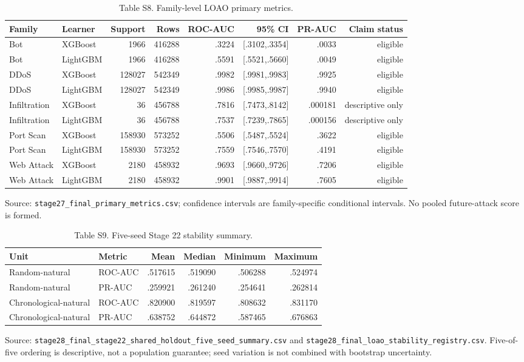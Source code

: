 \documentclass[preprint,12pt]{elsarticle}
\begin{document}
\begin{table}[htbp]
\centering\tiny
\caption{Table S8. Family-level LOAO primary metrics.}
\begin{tabular}{@{}llrrrrrr@{}}
\toprule
Family & Learner & Support & Rows & ROC-AUC & 95\% CI & PR-AUC & Claim status\\
\midrule
Bot & XGBoost & 1966 & 416288 & .3224 & [.3102,.3354] & .0033 & eligible\\
Bot & LightGBM & 1966 & 416288 & .5591 & [.5521,.5660] & .0049 & eligible\\
DDoS & XGBoost & 128027 & 542349 & .9982 & [.9981,.9983] & .9925 & eligible\\
DDoS & LightGBM & 128027 & 542349 & .9986 & [.9985,.9987] & .9940 & eligible\\
Infiltration & XGBoost & 36 & 456788 & .7816 & [.7473,.8142] & .000181 & descriptive only\\
Infiltration & LightGBM & 36 & 456788 & .7537 & [.7239,.7865] & .000156 & descriptive only\\
Port Scan & XGBoost & 158930 & 573252 & .5506 & [.5487,.5524] & .3622 & eligible\\
Port Scan & LightGBM & 158930 & 573252 & .7559 & [.7546,.7570] & .4191 & eligible\\
Web Attack & XGBoost & 2180 & 458932 & .9693 & [.9660,.9726] & .7206 & eligible\\
Web Attack & LightGBM & 2180 & 458932 & .9901 & [.9887,.9914] & .7605 & eligible\\
\bottomrule
\end{tabular}
\end{table}
Source: \texttt{stage27\_final\_primary\_metrics.csv}; confidence intervals are family-specific conditional intervals. No pooled future-attack score is formed.

\begin{table}[htbp]
\centering\scriptsize
\caption{Table S9. Five-seed Stage 22 stability summary.}
\begin{tabular}{@{}llrrrr@{}}
\toprule
Unit & Metric & Mean & Median & Minimum & Maximum\\
\midrule
Random-natural & ROC-AUC & .517615 & .519090 & .506288 & .524974\\
Random-natural & PR-AUC & .259921 & .261240 & .254641 & .262814\\
Chronological-natural & ROC-AUC & .820900 & .819597 & .808632 & .831170\\
Chronological-natural & PR-AUC & .638752 & .644872 & .587465 & .676863\\
\bottomrule
\end{tabular}
\end{table}
Source: \texttt{stage28\_final\_stage22\_shared\_holdout\_five\_seed\_summary.csv} and \texttt{stage28\_final\_loao\_stability\_registry.csv}. Five-of-five ordering is descriptive, not a population guarantee; seed variation is not combined with bootstrap uncertainty.
\end{document}
